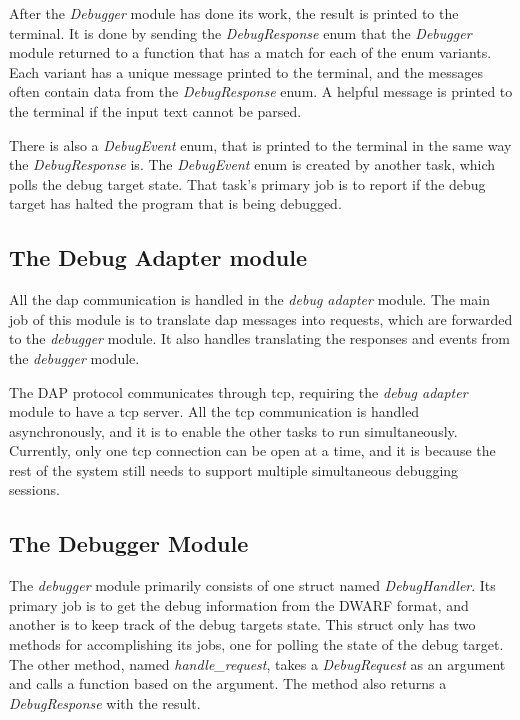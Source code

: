 After the \emph{Debugger} module has done its work, the result is printed to the terminal.
It is done by sending the \emph{DebugResponse} enum that the \emph{Debugger} module returned to a function that has a match for each of the enum variants.
Each variant has a unique message printed to the terminal, and the messages often contain data from the \emph{DebugResponse} enum.
A helpful message is printed to the terminal if the input text cannot be parsed.


There is also a \emph{DebugEvent} enum, that is printed to the terminal in the same way the \emph{DebugResponse} is.
The \emph{DebugEvent} enum is created by another task, which polls the debug target state.
That task's primary job is to report if the debug target has halted the program that is being debugged.



\subsection{The Debug Adapter module}
All the \gls{dap} communication is handled in the \emph{debug adapter} module.
The main job of this module is to translate \gls{dap} messages into requests, which are forwarded to the \emph{debugger} module.
It also handles translating the responses and events from the \emph{debugger} module.


The DAP protocol communicates through \gls{tcp}, requiring the \emph{debug adapter} module to have a \gls{tcp} server.
All the \gls{tcp} communication is handled asynchronously, and it is to enable the other tasks to run simultaneously.
Currently, only one \gls{tcp} connection can be open at a time, and it is because the rest of the system still needs to support multiple simultaneous debugging sessions.



\subsection{The Debugger Module}
The \emph{debugger} module primarily consists of one struct named \emph{DebugHandler}.
Its primary job is to get the debug information from the \gls{DWARF} format, and another is to keep track of the debug targets state.
This struct only has two methods for accomplishing its jobs, one for polling the state of the debug target.
The other method, named \emph{handle\_request}, takes a \emph{DebugRequest} as an argument and calls a function based on the argument.
The method also returns a \emph{DebugResponse} with the result.


